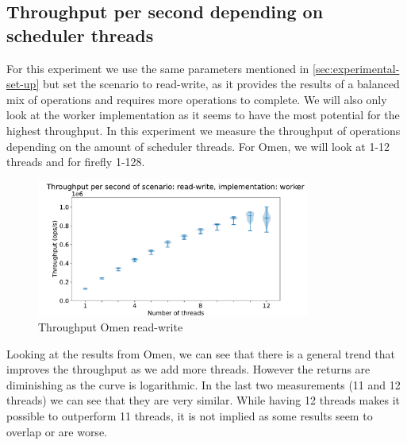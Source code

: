 \documentclass{article}
\begin{document}

\subsection{Throughput per second depending on scheduler threads}
\label{sec:throughput-per-second-depending-on-scheduler-threads}
For this experiment we use the same parameters mentioned in
\autoref{sec:experimental-set-up} but set the scenario to read-write, as it
provides the results of a balanced mix of operations and requires more
operations to complete. We will also only look at the worker implementation as
it seems to have the most potential for the highest throughput. In this experiment we measure the throughput of
operations depending on the amount of scheduler threads. For Omen, we will look
at 1-12 threads and for firefly 1-128.
\begin{figure}[H]
	\centering
	\includegraphics[width=0.8\textwidth]{violinplots/omen/throughput-per-second-of-scenario-read-write-implementation-worker-violinplot.pdf}
	\caption{Throughput Omen read-write}
	\label{fig:throughput-omen-read-write-depend-threads}
\end{figure}
Looking at the results from Omen, we can see that there is a general trend that
improves the throughput as we add more threads. However the returns are
diminishing as the curve is logarithmic. In the last two measurements (11 and 12
threads) we can see that they are very similar. While having 12 threads makes it
possible to outperform 11 threads, it is not implied as some results seem to
overlap or are worse.
\end{document}
